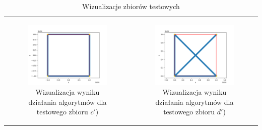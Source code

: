 \documentclass[a4paper]{article}
\begin{document}
\begin{table}[H]
\begin{tabular}{cc}
        \begin{subfigure}{0.5\textwidth}
            \includegraphics[width=\columnwidth]{tests/graham/graham_points_c_test.png}
            \caption{Wizualizacja wyniku działania algorytmów dla testowego zbioru $c'$)}
            \label{fig:points_c_test}
        \end{subfigure} & 
        \begin{subfigure}{0.5\textwidth}
            \includegraphics[width=\columnwidth]{tests/graham/graham_points_d_test.png}
            \caption{Wizualizacja wyniku działania algorytmów dla testowego zbioru $d'$)}
            \label{fig:points_d_test}
        \end{subfigure} \\
    
    \end{tabular}
    \caption{Wizualizacje zbiorów testowych}
\end{table}
\end{document}
